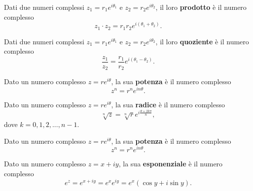 \documentclass{book}
\begin{document}
\begin{theorem}
    Dati due numeri complessi \( z_1 = r_1 e^{i\theta_1} \) e \( z_2 = r_2 e^{i\theta_2} \), il loro \textbf{prodotto} è il numero complesso
    \[ z_1 \cdot z_2 = r_1 r_2 e^{i(\theta_1 + \theta_2)}. \]
\end{theorem}
\begin{theorem}
    Dati due numeri complessi \( z_1 = r_1 e^{i\theta_1} \) e \( z_2 = r_2 e^{i\theta_2} \), il loro \textbf{quoziente} è il numero complesso
    \[ \frac{z_1}{z_2} = \frac{r_1}{r_2} e^{i(\theta_1 - \theta_2)}. \]
\end{theorem}

\begin{theorem}
    Dato un numero complesso \( z = r e^{i\theta} \), la sua \textbf{potenza} è il numero complesso
    \[ z^n = r^n e^{i n \theta}. \]
\end{theorem}
\begin{theorem}
    Dato un numero complesso \( z = r e^{i\theta} \), la sua \textbf{radice} è il numero complesso
    \[ \sqrt[n]{z} = \sqrt[n]{r} e^{i \frac{\theta + 2k\pi}{n}}, \]
    dove \( k = 0, 1, 2, ..., n - 1 \).
\end{theorem}
\begin{theorem}
    Dato un numero complesso \( z = r e^{i\theta} \), la sua \textbf{potenza} è il numero complesso
    \[ z^n = r^n e^{i n \theta}. \]
\end{theorem}
\begin{definition}
    Dato un numero complesso \( z = x + iy \), la sua \textbf{esponenziale} è il numero complesso
    \[ e^z = e^{x + iy} = e^x e^{iy} = e^x (\cos y + i \sin y). \]
\end{definition}
\end{document}
